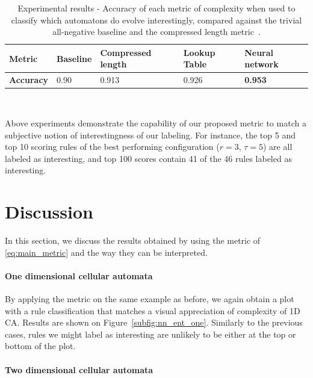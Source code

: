 \begin{table}[t!]
  \renewcommand{\arraystretch}{1.2}
  \centering
  \begin{tabular}{lm{.1\linewidth}m{.19\linewidth}m{.1\linewidth}m{.11\linewidth}}
    \toprule
    \bfseries  Metric & Baseline & Compressed length
    \parencite{zenilCompressionBasedInvestigationDynamical2010} &
    Lookup Table & Neural network \\ \midrule
    \bfseries Accuracy & 0.90 & 0.913 & 0.926 & \bfseries 0.953 \\ \bottomrule
  \end{tabular}
  \\[+8pt]
  \caption{Experimental results - Accuracy of each metric of complexity when
    used to classify which automatons do evolve interestingly, compared against
    the trivial all-negative baseline and the compressed length
    metric~\parencite{zenilCompressionBasedInvestigationDynamical2010}.}
  \label{experiments_table2}
\end{table}

Above experiments demonstrate the capability of our proposed metric to match a
subjective notion of interestingness of our labeling. For instance, the top 5
and top 10 scoring rules of the best performing configuration ($r=3$, $\tau =
5$) are all labeled as interesting, and top 100 scores contain 41 of the 46
rules labeled as interesting.

\section{Discussion}

In this section, we discuss the results obtained by using the metric of
\eqref{eq:main_metric} and the way they can be interpreted.

\paragraph{One dimensional cellular automata}
By applying the metric on the same example as before, we again obtain a
plot with a rule classification that matches a visual appreciation of
complexity of 1D CA. Results are shown on Figure~\ref{subfig:nn_ent_one}.
Similarly to the previous cases, rules we might label as interesting are
unlikely to be either at the top or bottom of the plot.

\paragraph{Two dimensional cellular automata}

